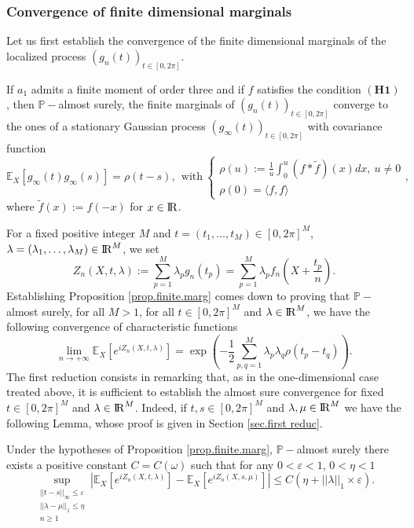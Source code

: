 \documentclass{svproc}
\newcommand{\Prob}{\mathbb{P}}
\newcommand \Esp {\mathbb{E}}
\def\R{{\rm I\kern-0.16em R}}
\begin{document}
\subsubsection{Convergence of finite dimensional marginals}
Let us first establish the convergence of the finite dimensional marginals of the localized process $(g_n(t))_{t\in[0,2\pi]}$. 
\begin{proposition} \label{prop.finite.marg}
If $a_1$ admits a finite moment of order three and if $f$ satisfies the condition $\mathbf{(H1)}$, then $\Prob-$almost surely, the finite marginals of $(g_n(t))_{t\in[0,2\pi]}$ converge to the ones of a stationary Gaussian process $(g_{\infty}(t))_{t\in [0,2\pi]}$ with covariance function
$$\Esp_X[g_{\infty}(t)g_{\infty}(s)] = \rho(t-s),~~\text{with}~\left\{\begin{array}{l}\displaystyle \rho(u):=\frac{1}{u}\int_0^{u}(f\ast \widetilde{f})(x)dx,~u\neq 0 \\\rho(0)=\langle f,f \rangle \end{array}\right.,$$
where $\widetilde{f}(x):=f(-x)$ for $x\in \R$.
\end{proposition}
\noindent
For a fixed positive integer $M$ and $t=(t_1,\dots, t_M) \in [0,2\pi]^{M}$,  $\lambda=(\lambda_1,\dots,\lambda_M)\in \R^M$, we set
\[
Z_n(X,t,\lambda):=\sum_{p=1}^{M}\lambda_pg_n(t_p) =\sum_{p=1}^{M}\lambda_p f_n\left(X+\frac{t_p}{n}\right).
\]
Establishing Proposition \ref{prop.finite.marg} comes down to proving that $\Prob-$almost surely, for all $M>1$, for all $t \in [0,2\pi]^{M}$ and $\lambda\in \R^M$, we have the following convergence of characteristic functions
\[
\lim_{n \to +\infty} \Esp_X \left[e^{iZ_n(X,t,\lambda)} \right]=\exp\left(-\frac{1}{2}\sum_{p,q=1}^{M} \lambda_p \lambda_q\rho(t_p-t_q) \right).
\]
The first reduction consists in remarking that, as in the one-dimensional case treated above, it is sufficient to establish the almost sure convergence for  fixed $t \in [0,2\pi]^{M}$ and $\lambda\in \R^M$. Indeed, if $t,s \in [0,2\pi]^{M}$ and $\lambda, \mu \in \R^M$ we have the following Lemma, whose proof is given in Section \ref{sec.first reduc}. 
\begin{lemma}\label{lem.first reduc}Under the hypotheses of Proposition \ref{prop.finite.marg}, $\mathbb P-$almost surely there exists a positive constant $C=C(\omega)$ such that for any $0<\varepsilon<1$, $0<\eta<1$
\[
\sup_{\substack{||t-s||_{\infty} \leq \varepsilon \\ ||\lambda-\mu||_1 \leq \eta\\ n \geq 1}}\left| \Esp_X \left[e^{iZ_n(X,t,\lambda)} \right] -\Esp_X \left[e^{iZ_n(X,s,\mu)} \right]  \right|\leq C\left( \eta+||\lambda||_1 \times \varepsilon\right).
\]
\end{lemma} 
\end{document}
